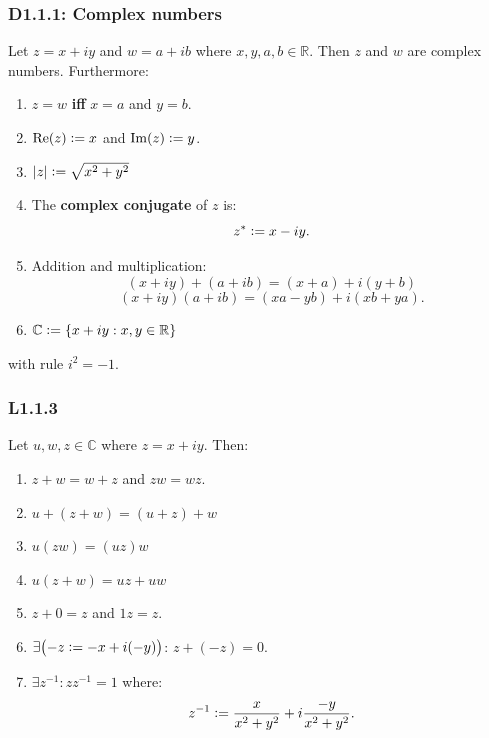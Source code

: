 \documentclass{article}
\newcommand{\deq}{\vcentcolon=}
\begin{document}
\begin{multicols*}{3}
\noindent

\subsubsection*{D1.1.1: Complex numbers}
Let $z=x+iy$ and $w=a+ib$ where $x,y,a,b\in\mathbb{R}$.
Then $z$ and $w$ are complex numbers. Furthermore:
\begin{enumerate}
    \item $z=w$ \textbf{if{}f} $x=a$ and $y=b$.
    
    \item $\Re(z)\deq x$ and $\Im(z)\deq y$.
    
    \item $|z|\deq\sqrt{x^2+y^2}$
    
    \item The \textbf{complex conjugate} of $z$ is:
    $$z^*\deq x-iy.$$

    \item Addition and multiplication:
    $$(x+iy)+(a+ib)=(x+a)+i(y+b)$$
    $$(x+iy)(a+ib)=(xa-yb)+i(xb+ya).$$

    \item $\mathbb{C}\deq\{x+iy:x,y\in\mathbb{R}\}$
\end{enumerate}
with rule $i^2=-1$.

\subsubsection*{L1.1.3}
Let $u,w,z\in\mathbb{C}$ where $z=x+iy$. Then:
\begin{enumerate}
    \item $z+w=w+z$ and $zw=wz$.
    
    \item $u+(z+w)=(u+z)+w$
    
    \item $u(zw)=(uz)w$
    
    \item $u(z+w)=uz+uw$
    
    \item $z+0=z$ and $1z=z$.
    
    \item $\exists\bigl(-z\deq-x+i(-y)\bigr)$:
    $z+(-z)=0$.

    \item $\exists z^{-1}: zz^{-1}=1$ where:
    $$z^{-1}\deq\frac{x}{x^2+y^2}+i\frac{-y}{x^2+y^2}.$$
\end{enumerate}


\end{multicols*}
\end{document}
